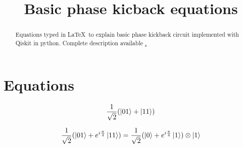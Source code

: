 \documentclass[]{article}
\title{Basic phase kicback equations}
\author{}
\date{}
\begin{document}
\maketitle

\begin{abstract}
	Equations typed in \LaTeX\ to explain basic phase kickback circuit implemented with Qiskit in python. Complete description available \href{https://github.com/epelaaez/QuantumLibrary/tree/master/algorithms/basic_phase_kickback}.
\end{abstract}

\section*{Equations}

\begin{equation*}
\frac{1}{\sqrt{2}}(\ket{01} + \ket{11})
\end{equation*}

\begin{equation*}
\frac{1}{\sqrt{2}}(\ket{01} + e^{i\frac{\pi}{4}}\ket{11}) = \frac{1}{\sqrt{2}}(\ket{0} + e^{i\frac{\pi}{4}}\ket{1}) \otimes \ket{1}
\end{equation*}
\end{document}
